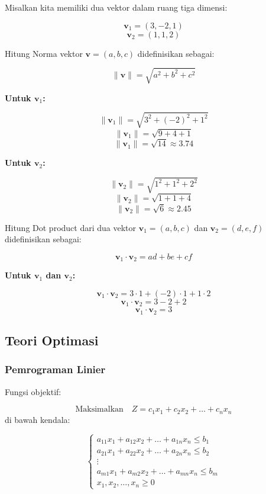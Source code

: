 \documentclass[
]{book}
\begin{document}
Misalkan kita memiliki dua vektor dalam ruang tiga dimensi:

\[ \mathbf{v}_1 = (3, -2, 1) \]
\[ \mathbf{v}_2 = (1, 1, 2) \]

Hitung Norma vektor \(\mathbf{v} = (a, b, c)\) didefinisikan sebagai:

\[ \| \mathbf{v} \| = \sqrt{a^2 + b^2 + c^2} \]

\textbf{Untuk \(\mathbf{v}_1\):}

\[ \| \mathbf{v}_1 \| = \sqrt{3^2 + (-2)^2 + 1^2} \]
\[ \| \mathbf{v}_1 \| = \sqrt{9 + 4 + 1} \]
\[ \| \mathbf{v}_1 \| = \sqrt{14} \approx 3.74 \]

\textbf{Untuk \(\mathbf{v}_2\):}

\[ \| \mathbf{v}_2 \| = \sqrt{1^2 + 1^2 + 2^2} \]
\[ \| \mathbf{v}_2 \| = \sqrt{1 + 1 + 4} \]
\[ \| \mathbf{v}_2 \| = \sqrt{6} \approx 2.45 \]

Hitung Dot product dari dua vektor \(\mathbf{v}_1 = (a, b, c)\) dan \(\mathbf{v}_2 = (d, e, f)\) didefinisikan sebagai:

\[ \mathbf{v}_1 \cdot \mathbf{v}_2 = ad + be + cf \]

\textbf{Untuk \(\mathbf{v}_1\) dan \(\mathbf{v}_2\):}

\[ \mathbf{v}_1 \cdot \mathbf{v}_2 = 3 \cdot 1 + (-2) \cdot 1 + 1 \cdot 2 \]
\[ \mathbf{v}_1 \cdot \mathbf{v}_2 = 3 - 2 + 2 \]
\[ \mathbf{v}_1 \cdot \mathbf{v}_2 = 3 \]

\subsection{Teori Optimasi}\label{teori-optimasi-1}

\subsubsection*{Pemrograman Linier}\label{pemrograman-linier}

Fungsi objektif:

\[
  \text{Maksimalkan} \quad Z = c_1 x_1 + c_2 x_2 + \ldots + c_n x_n
\]
di bawah kendala:

\[
  \begin{cases}
  a_{11}x_1 + a_{12}x_2 + \ldots + a_{1n}x_n \le b_1 \\
  a_{21}x_1 + a_{22}x_2 + \ldots + a_{2n}x_n \le b_2 \\
  \vdots \\
  a_{m1}x_1 + a_{m2}x_2 + \ldots + a_{mn}x_n \le b_m \\
  x_1, x_2, \ldots, x_n \ge 0
  \end{cases}
\]
\end{document}
